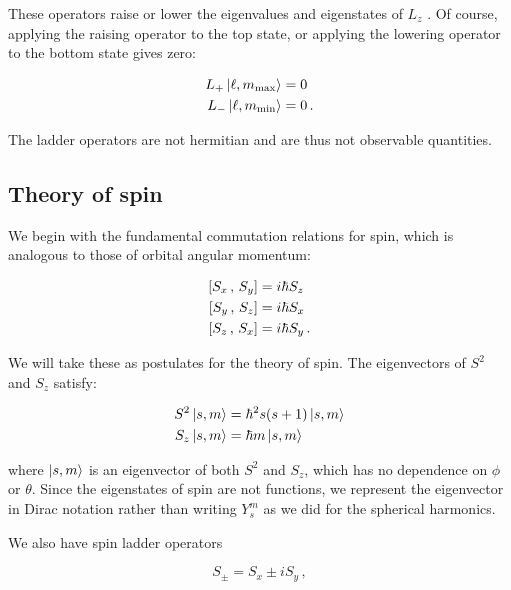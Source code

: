 \documentclass[12pt, titlepage]{article}
\newcommand{\com}[2]{\qty[#1 \,,\, #2]}
\begin{document}

These operators raise or lower the eigenvalues and eigenstates of $L_{z}$ . Of course, applying the raising operator to the top state, or applying the lowering operator to the bottom state gives zero:

\begin{subequations}
\begin{align}
	L_{+}\ket{\ell, m_{\text{max}}} &= 0 \\
	L_{-}\ket{\ell, m_{\text{min}}} &= 0 \, .
\end{align}
\end{subequations}

The ladder operators are not hermitian and are thus not observable quantities.
 
 \subsection{Theory of spin}
 We begin with the fundamental commutation relations for spin, which is analogous to those of orbital angular momentum:
 
 \begin{subequations}
 	\begin{align}
 	\com{S_{x}}{S_{y}} &= i \hbar S_{z} \\
 	\com{S_{y}}{S_{z}} &= i \hbar S_{x} \\
 	\com{S_{z}}{S_{x}} &= i \hbar S_{y} \, .
 	\end{align}
 \end{subequations}

We will take these as postulates for the theory of spin. The eigenvectors of $S^2$ and $S_{z}$ satisfy:

\begin{align}
	S^2 \ket{s, m} &= \hbar^2 s(s+1)\ket{s, m} \\
	S_{z} \ket{s, m} &= \hbar m \ket{s, m}
\end{align}

where $\ket{s, m}$ is an eigenvector of both $S^2$ and $S_z$, which has no dependence on $\phi$ or $\theta$. Since the eigenstates of spin are not functions, we represent the eigenvector in Dirac notation rather than writing $Y_{s}^{m}$ as we did for the spherical harmonics.


We also have spin ladder operators

\begin{equation}
	S_{\pm} = S_{x} \pm i S_{y} \,,
\end{equation}
\end{document}

